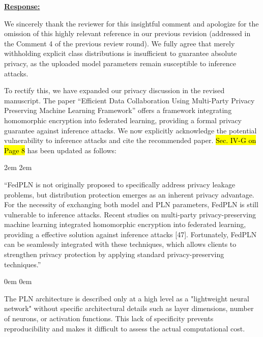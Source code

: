 \documentclass[a4paper,12pt]{article}
\newcommand{\hlb}[1]{\sethlcolor{b}\hl{#1}}
\begin{document}
\noindent \underline {\textbf{Response:}}
\bigskip

We sincerely thank the reviewer for this insightful comment and apologize for the omission of this highly relevant reference in our previous revision (addressed in the Comment 4 of the previous review round).
We fully agree that merely withholding explicit class distributions is insufficient to guarantee absolute privacy, as the uploaded model parameters remain susceptible to inference attacks.

To rectify this, we have expanded our privacy discussion in the revised manuscript.
The paper ``Efficient Data Collaboration Using Multi-Party Privacy Preserving Machine Learning Framework'' offers a framework integrating homomorphic encryption into federated learning, providing a formal privacy guarantee against inference attacks.
We now explicitly acknowledge the potential vulnerability to inference attacks and cite the recommended paper.
\hlb{Sec. IV-G on Page 8} has been updated as follows:

\leftskip 2em
\rightskip 2em
\medskip

\noindent
``FedPLN is not originally proposed to specifically address privacy leakage problems, but distribution protection emerges as an inherent privacy advantage.
For the necessity of exchanging both model and PLN parameters, FedPLN is still vulnerable to inference attacks.
Recent studies on multi-party privacy-preserving machine learning integrated homomorphic encryption into federated learning, providing a effective solution against inference attacks [47].
Fortunately, FedPLN can be seamlessly integrated with these techniques, which allows clients to strengthen privacy protection by applying standard privacy-preserving techniques.''

\leftskip 0em
\rightskip 0em
\medskip

\begin{tcolorbox}[title = {Comment 5},fonttitle = \bfseries]
	The PLN architecture is described only at a high level as a "lightweight neural network" without specific architectural details such as layer dimensions, number of neurons, or activation functions. This lack of specificity prevents reproducibility and makes it difficult to assess the actual computational cost.
\end{tcolorbox}
\end{document}

